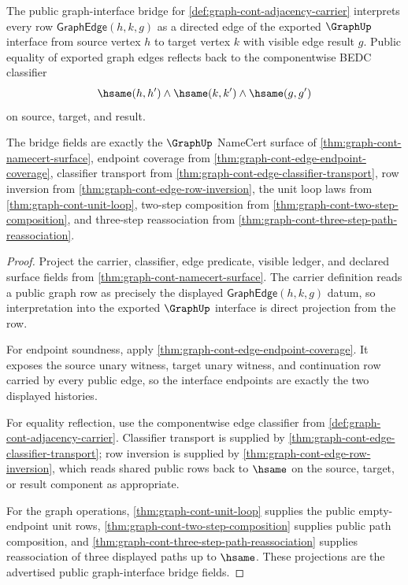 \begin{theorem}
\label{thm:graph-cont-public-interface-bridge}
The public graph-interface bridge for
\autoref{def:graph-cont-adjacency-carrier} interprets every row
$\mathsf{GraphEdge}(h,k,g)$ as a directed edge of the exported $\GraphUp$
interface from source vertex $h$ to target vertex $k$ with visible edge result
$g$. Public equality of exported graph edges reflects back to the componentwise
BEDC classifier
$$
\hsame(h,h')\land \hsame(k,k')\land \hsame(g,g')
$$
on source, target, and result.

The bridge fields are exactly the $\GraphUp$ NameCert surface of
\autoref{thm:graph-cont-namecert-surface}, endpoint coverage from
\autoref{thm:graph-cont-edge-endpoint-coverage}, classifier transport from
\autoref{thm:graph-cont-edge-classifier-transport}, row inversion from
\autoref{thm:graph-cont-edge-row-inversion}, the unit loop laws from
\autoref{thm:graph-cont-unit-loop}, two-step composition from
\autoref{thm:graph-cont-two-step-composition}, and three-step reassociation
from \autoref{thm:graph-cont-three-step-path-reassociation}.
\end{theorem}
\begin{proof}
Project the carrier, classifier, edge predicate, visible ledger, and declared
surface fields from \autoref{thm:graph-cont-namecert-surface}. The carrier
definition reads a public graph row as precisely the displayed
$\mathsf{GraphEdge}(h,k,g)$ datum, so interpretation into the exported
$\GraphUp$ interface is direct projection from the row.

For endpoint soundness, apply
\autoref{thm:graph-cont-edge-endpoint-coverage}. It exposes the source unary
witness, target unary witness, and continuation row carried by every public
edge, so the interface endpoints are exactly the two displayed histories.

For equality reflection, use the componentwise edge classifier from
\autoref{def:graph-cont-adjacency-carrier}. Classifier transport is supplied by
\autoref{thm:graph-cont-edge-classifier-transport}; row inversion is supplied by
\autoref{thm:graph-cont-edge-row-inversion}, which reads shared public rows back
to $\hsame$ on the source, target, or result component as appropriate.

For the graph operations, \autoref{thm:graph-cont-unit-loop} supplies the public
empty-endpoint unit rows, \autoref{thm:graph-cont-two-step-composition} supplies
public path composition, and
\autoref{thm:graph-cont-three-step-path-reassociation} supplies reassociation of
three displayed paths up to $\hsame$. These projections are the advertised
public graph-interface bridge fields.
\end{proof}

